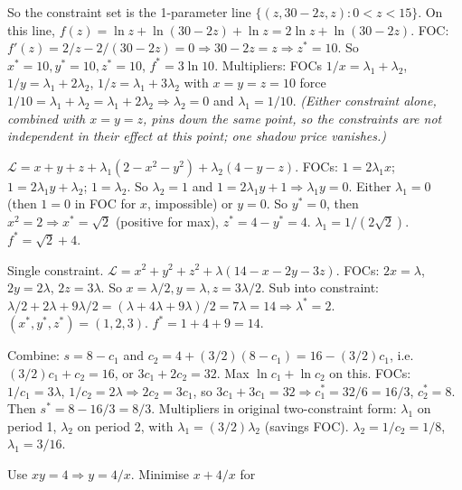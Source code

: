 \begin{solutions}
        So the constraint set is the 1-parameter line
        $\{(z, 30 - 2 z, z) : 0 < z < 15\}$. On this line,
        $f(z) = \ln z + \ln(30 - 2 z) + \ln z = 2 \ln z + \ln(30 - 2 z)$.
        FOC: $f'(z) = 2/z - 2/(30 - 2 z) = 0 \Rightarrow
        30 - 2 z = z \Rightarrow z^* = 10$. So
        $x^* = 10, y^* = 10, z^* = 10$, $f^* = 3 \ln 10$.
        Multipliers: FOCs $1/x = \lambda_1 + \lambda_2$,
        $1/y = \lambda_1 + 2 \lambda_2$,
        $1/z = \lambda_1 + 3 \lambda_2$ with $x = y = z = 10$ force
        $1/10 = \lambda_1 + \lambda_2 = \lambda_1 + 2 \lambda_2
        \Rightarrow \lambda_2 = 0$ and $\lambda_1 = 1/10$.
        \emph{(Either constraint alone, combined with $x = y = z$, pins
        down the same point, so the constraints are not independent in
        their effect at this point; one shadow price vanishes.)}
  \item $\mathcal{L} = x + y + z + \lambda_1(2 - x^2 - y^2)
        + \lambda_2(4 - y - z)$. FOCs: $1 = 2 \lambda_1 x$;
        $1 = 2 \lambda_1 y + \lambda_2$; $1 = \lambda_2$. So
        $\lambda_2 = 1$ and $1 = 2 \lambda_1 y + 1 \Rightarrow
        \lambda_1 y = 0$. Either $\lambda_1 = 0$ (then $1 = 0$ in FOC for
        $x$, impossible) or $y = 0$. So $y^* = 0$, then
        $x^2 = 2 \Rightarrow x^* = \sqrt{2}$ (positive for max),
        $z^* = 4 - y^* = 4$. $\lambda_1 = 1/(2 \sqrt{2})$.
        $f^* = \sqrt{2} + 4$.
  \item Single constraint. $\mathcal{L} = x^2 + y^2 + z^2
        + \lambda(14 - x - 2 y - 3 z)$. FOCs: $2 x = \lambda$,
        $2 y = 2 \lambda$, $2 z = 3 \lambda$. So
        $x = \lambda/2, y = \lambda, z = 3 \lambda/2$. Sub into
        constraint: $\lambda/2 + 2 \lambda + 9 \lambda/2
        = (\lambda + 4 \lambda + 9 \lambda)/2 = 7 \lambda = 14
        \Rightarrow \lambda^* = 2$. $(x^*, y^*, z^*) = (1, 2, 3)$.
        $f^* = 1 + 4 + 9 = 14$.
  \item Combine: $s = 8 - c_1$ and
        $c_2 = 4 + (3/2)(8 - c_1) = 16 - (3/2) c_1$, i.e.\
        $(3/2) c_1 + c_2 = 16$, or $3 c_1 + 2 c_2 = 32$. Max
        $\ln c_1 + \ln c_2$ on this. FOCs: $1/c_1 = 3 \lambda$,
        $1/c_2 = 2 \lambda \Rightarrow 2 c_2 = 3 c_1$, so
        $3 c_1 + 3 c_1 = 32 \Rightarrow c_1^* = 32/6 = 16/3$,
        $c_2^* = 8$. Then $s^* = 8 - 16/3 = 8/3$. Multipliers in
        original two-constraint form: $\lambda_1$ on period 1,
        $\lambda_2$ on period 2, with $\lambda_1 = (3/2) \lambda_2$
        (savings FOC). $\lambda_2 = 1/c_2 = 1/8$, $\lambda_1 = 3/16$.
  \item Use $x y = 4 \Rightarrow y = 4/x$. Minimise $x + 4/x$ for

\end{solutions}
